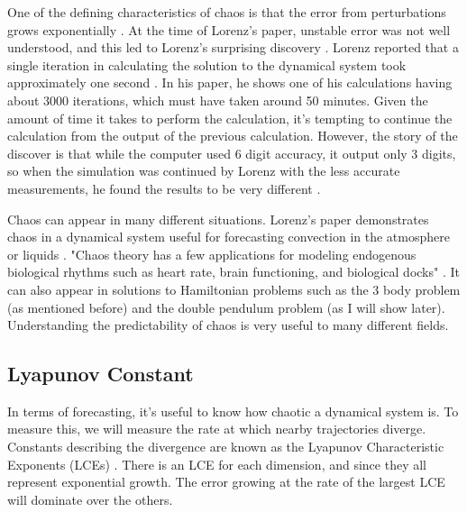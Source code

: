 \documentclass{article}
\begin{document}
One of the defining characteristics of chaos is that the error from 
perturbations grows exponentially \cite{oestreicher2007history}. At the time of 
Lorenz's paper, unstable 
error was not well understood, and this led to Lorenz's surprising discovery 
\cite{oestreicher2007history}. Lorenz reported that a single iteration in 
calculating the solution to the dynamical system took 
approximately one second \cite{lorenz1963deterministic}. In his paper, he shows 
one of his calculations having about 3000 iterations, which must have taken 
around 50 minutes. Given the amount of time it takes to perform the calculation,
it's tempting to continue the calculation from the output of the previous 
calculation. However, the story of the discover is that while the computer used 
6 digit accuracy, it output only 3 digits, so when the simulation was continued 
by Lorenz with the less accurate measurements, he found the results to be very 
different \cite{oestreicher2007history}. 

Chaos can appear in many different situations. Lorenz's paper demonstrates chaos
in a dynamical system useful for forecasting convection in the atmosphere or 
liquids \cite{lorenz1963deterministic}. "Chaos theory has a few applications for
modeling endogenous biological rhythms such as heart rate, brain functioning, 
and biological docks" \cite{oestreicher2007history}. It can also appear in 
solutions to Hamiltonian problems such as the 3 body problem (as mentioned 
before) and the double pendulum problem (as I will show later). Understanding
the predictability of chaos is very useful to many different fields.

\subsection{Lyapunov Constant}

In terms of forecasting, it's useful to know how chaotic a dynamical system is. 
To measure this, we will measure the rate at which nearby trajectories 
diverge. Constants describing the divergence are known as the Lyapunov 
Characteristic Exponents (LCEs) \cite{sandri1996numerical}. There is an LCE for 
each dimension, and since they all represent exponential growth. The error 
growing at the rate of the largest LCE will dominate over the others.

\end{document}
